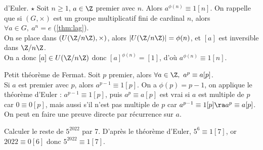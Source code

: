 \documentclass[11pt]{article}
\begin{document}
\vspace*{-0.8cm}

\begin{thm}{d'Euler. $\star$}{}
    Soit $n\geq1$, $a\in\Z$ premier avec $n$. Alors $a^{\phi(n)}\equiv1[n]$.
    \tcblower
    On rappelle que si $(G,\times)$ est un groupe multiplicatif fini de cardinal $n$, alors $\forall a \in G, ~ a^n = e$ (\ref{thm:lag}).\\
    On se place dans $(U(\Z/n\Z),\times)$, alors $|U(\Z/n\Z)|=\phi(n)$, et $[a]$ est inversible dans $\Z/n\Z$.\\
    On a donc $[a]\in U(\Z/n\Z)$ donc $[a]^{\phi(n)}=[1]$, d'où $a^{\phi(n)}\equiv 1[n]$.
\end{thm}

\vspace*{-0.8cm}

\begin{prop}{Petit théorème de Fermat.}{}
    Soit $p$ premier, alors $\forall a \in \Z, ~ a^{p}\equiv a[p]$.\\
    Si $a$ est premier avec $p$, alors $a^{p-1}\equiv1[p]$.
    \tcblower
    On a $\phi(p)=p-1$, on applique le théorème d'Euler : $a^{p-1}\equiv 1[p]$, puis $a^p\equiv a[p]$ est vrai si $a$ est multiple de $p$ car $0\equiv0[p]$, mais aussi s'il n'est pas multiple de $p$ car $a^{p-1}\equiv1[p]\ra a^p\equiv a[p]$.\n
    On peut en faire une preuve directe par récurrence sur $a$. 
\end{prop}

\vspace*{-0.5cm}

\begin{ex}{}{}
    Calculer le reste de $5^{2022}$ par 7.
    \tcblower
    D'après le théorème d'Euler, $5^6\equiv1[7]$, or $2022\equiv0[6]$ donc $5^{2022}\equiv1[7]$.
\end{ex}

\vspace*{-0.5cm}
\end{document}
